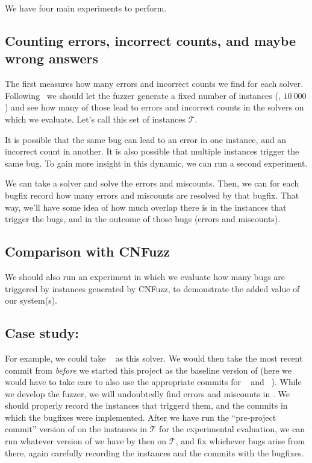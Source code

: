 \documentclass[a4paper]{tufte-handout}
\begin{document}
	\begin{experiments}
		We have four main experiments to perform.
		
		\subsection*{Counting errors, incorrect counts, and maybe wrong answers}
		
		The first measures how many errors and incorrect counts we find for each solver.
		Following~\citep{BLB10}\cite{BLB10} we should let the fuzzer generate a fixed number of instances (\eg{}, $10\:000$) and see how many of those lead to errors and incorrect counts in the solvers on which we evaluate.
		Let's call this set of instances $\mathcal{T}$.
		
		It is possible that the same bug can lead to an error in one instance, and an incorrect count in another. 
		It is also possible that multiple instances trigger the same bug. 
		To gain more insight in this dynamic, we can run a second experiment.
		
		We can take a solver and solve the errors and miscounts.
		Then, we can for each bugfix record how many errors and miscounts are resolved by that bugfix.
		That way, we'll have some idea of how much overlap there is in the instances that trigger the bugs, and in the outcome of those bugs (errors and miscounts).
		
		\subsection*{Comparison with CNFuzz}
		
		We should also run an experiment in which we evaluate how many bugs are triggered by instances generated by CNFuzz, to demonstrate the added value of our system(s).
		
		\subsection*{Case study: \approxmc{}}
		
		For example, we could take \approxmc{}~\citep{CMV16,SM19}\cite{CMV16,SM19} as this solver.
		We would then take the most recent commit from {\em before} we started this project as the baseline version of \approxmc{} (here we would have to take care to also use the appropriate commits for \cryptominisat{}~\citep{SKC09}\cite{SKC09} and \arjun{}~\citep{SM21}\cite{SM21}).
		While we develop the fuzzer, we will undoubtedly find errors and miscounts in \approxmc{}.
		We should properly record the instances that triggerd them, and the commits in which the bugfixes were implemented.
		After we have run the ``pre-project commit'' version of \approxmc{} on the instances in $\mathcal{T}$ for the experimental evaluation, we can run whatever version of \approxmc{} we have by then on $\mathcal{T}$, and fix whichever bugs arise from there, again carefully recording the instances and the commits with the bugfixes.
		

\end{experiments}
\end{document}
